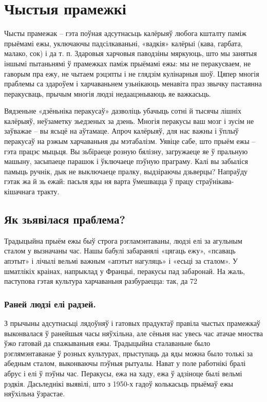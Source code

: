 \chapter{Чыстыя прамежкі}

Чысты прамежак – гэта поўная адсутнасьць калёрыяў любога кшталту паміж прыёмамі ежы, уключаючы падсілкаваньні, «вадкія» калёрыі (кава, гарбата, малако, сок) і да т. п. Здаровыя харчовыя паводзіны мяркуюць, што мы занятыя іншымі пытаньнямі ў прамежках паміж прыёмамі ежы: мы не перакусваем, не гаворым пра ежу, не чытаем рэцэпты і не глядзім кулінарныя шоў. Цяпер многія праблемы са здароўем і харчаваньнем узьнікаюць менавіта праз звычку пастаянна перакусваць, прычым многія людзі недаацэньваюць яе важкасьць.

Вядзеньне «дзёньніка перакусаў» дазволіць убачыць сотні й тысячы лішніх калёрыяў, неўзаметку зьедзеных за дзень. Многія перакусы ваш мозг і зусім не заўважае – вы ясьцё на аўтамаце. Апроч калёрыяў, для нас важны і ўплыў перакусаў на рэжым харчаваньня ды мэтабалізм. Уявіце сабе, што прыём ежы – гэта працэс мыцьця. Вы зьбіраеце розную бялізну, загружаеце яе ў пральную машыну, засыпаеце парашок і ўключаеце пэўную праграму. Калі вы забыліся памыць ручнік, дык не выключаеце пралку, выдзіраючы дзьверцы? Напраўду гэтак жа й зь ежай: пасьля яды ня варта ўмешвацца ў працу страўнікава-кішачнага тракту.

\section{Як зьявілася праблема?}
Традыцыйна прыём ежы быў строга рэгламэнтаваны, людзі елі за агульным сталом у вызначаны час. Нашы бабулі забаранялі «цягаць ежу», «псаваць апэтыт» і лічылі вельмі важным «апэтыт нагуляць» і «есьці за сталом». У шматлікіх краінах, напрыклад у Францыі, перакусы пад забаронай. На жаль, паступова гэтая культура харчаваньня разбураецца: так, да 72%

\subsection{Раней людзі елі радзей.}
З прычыны адсутнасьці лядоўняў і гатовых прадуктаў правіла чыстых прамежкаў выконвалася ў ранейшыя часы няўхільна, але сёньня нас увесь час атачае мноства ўжо гатовай да спажываньня ежы. Традыцыйна сталаваньне было рэглямэнтаванае ў розных культурах, прыступаць да яды можна было толькі за абедным сталом, выконваючы пэўныя рытуалы. Нават у поле работнікі бралі абрус і елі ў пэўны час. Перакусы, ежа на хаду, ежа ў адзіноце былі вельмі рэдкія. Дасьледнікі выявілі, што з 1950-х гадоў колькасьць прыёмаў ежы няўхільна ўзрастае.

